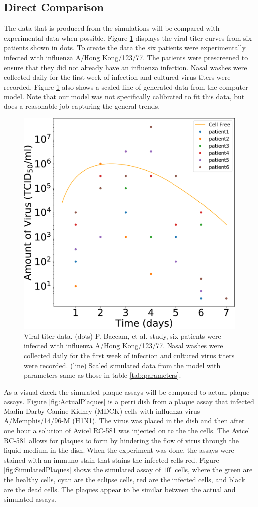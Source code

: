 \documentclass[a4paper]{article}
\begin{document}
\subsection{Direct Comparison}
The data that is produced from the simulations will be compared with experimental data when possible. Figure \ref{fig:CurveWithBaccamData} displays the viral titer curves from six patients shown in dots. To create the data the six patients were experimentally infected with influenza A/Hong Kong/123/77. The patients were prescreened to ensure that they did not already have an influenza infection. Nasal washes were collected daily for the first week of infection and cultured virus titers were recorded. Figure \ref{fig:CurveWithBaccamData} also shows a scaled line of generated data from the computer model. Note that our model was not specifically calibrated to fit this data, but does a reasonable job capturing the general trends.

\begin{figure}[h]
    \centering
    \includegraphics[width=0.6\linewidth]{Figures/MOI_-30_CellToCell_CellFree_ViralTitter.pdf}
    \caption{Viral titer data. (dots) P. Baccam, et al. study, six patients were infected with influenza A/Hong Kong/123/77. Nasal washes were collected daily for the first week of infection and cultured virus titers were recorded. (line) Scaled simulated data from the model with parameters same as those in table \ref{tab:parameters}.}
    \label{fig:CurveWithBaccamData}
\end{figure}

As a visual check the simulated plaque assays will be compared to actual plaque assays. Figure \ref{fig:ActualPlaques} is a petri dish from a plaque assay that infected Madin-Darby Canine Kidney (MDCK) cells with influenza virus A/Memphis/14/96-M (H1N1). The virus was placed in the dish and then after one hour a solution of Avicel RC-581 was injected on to the the cells. The Avicel RC-581 allows for plaques to form by hindering the flow of virus through the liquid medium in the dish. When the experiment was done, the assays were stained with an immuno-stain that stains the infected cells red. Figure \ref{fig:SimulatedPlaques} shows the simulated assay of $10^{6}$ cells, where the green are the healthy cells, cyan are the eclipse cells, red are the infected cells, and black are the dead cells. The plaques appear to be similar between the actual and simulated assays.
\end{document}
